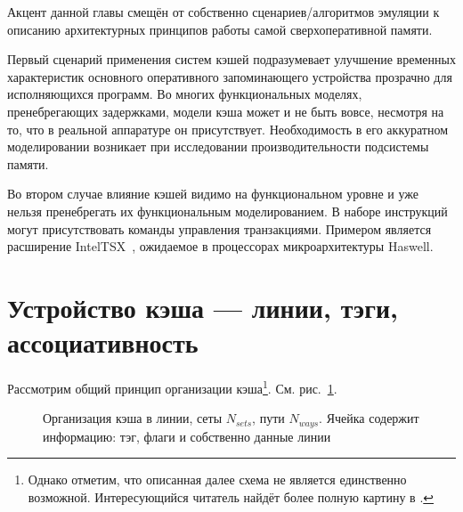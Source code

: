 \begin{digression}

Акцент данной главы смещён от собственно сценариев/алгоритмов эмуляции к описанию архитектурных принципов работы самой сверхоперативной памяти. 

Первый сценарий применения систем кэшей подразумевает улучшение временных характеристик основного оперативного запоминающего устройства прозрачно для исполняющихся программ. Во многих функциональных моделях, пренебрегающих задержками, модели кэша может и не быть вовсе, несмотря на то, что в реальной аппаратуре он присутствует. Необходимость в его аккуратном моделировании возникает при  исследовании производительности подсистемы памяти.

Во втором случае влияние кэшей видимо на функциональном уровне и уже нельзя пренебрегать их функциональным моделированием. В наборе инструкций могут присутствовать команды управления транзакциями. Примером является расширение Intel\textregistered TSX~\cite[глава 8]{intel-x-reference}, ожидаемое в процессорах микроархитектуры Haswell.

\end{digression}


\section{Устройство кэша --- линии, тэги, ассоциативность}

Рассмотрим общий принцип организации кэша\footnote{Однако отметим, что описанная далее схема не является единственно возможной. Интересующийся читатель найдёт более полную картину в \cite{hennessy-patterson}.}. См. рис.~\ref{fig:cache}.

\begin{figure}[htb]
    \centering
    \caption[Организация кэша в линии, сеты, пути]{Организация кэша в линии, сеты $N_{sets}$, пути $N_{ways}$. Ячейка содержит информацию: тэг, флаги и собственно данные линии}
    \label{fig:cache}
\end{figure}


